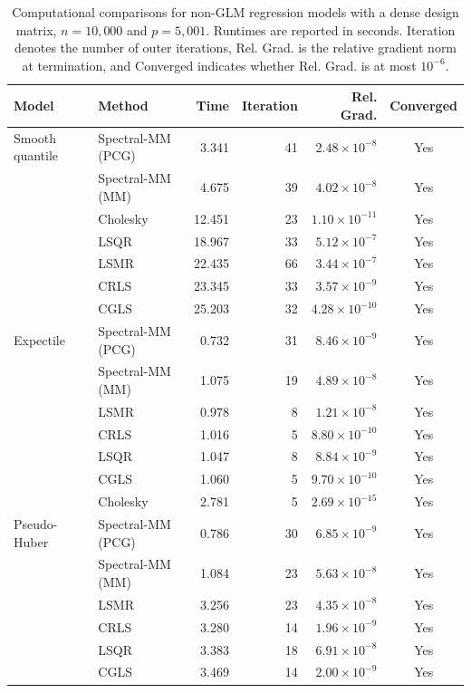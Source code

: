 \begin{table}[htbp]
\centering
\caption{
Computational comparisons for non-GLM regression models with a dense design matrix,
$n=10{,}000$ and $p=5{,}001$.
Runtimes are reported in seconds.
Iteration denotes the number of outer iterations,
Rel. Grad. is the relative gradient norm at termination,
and Converged indicates whether Rel. Grad. is at most $10^{-6}$.
}
\label{tab:nonglm-comparison-dense}
\begin{tabular}{llrrrc}
\toprule
Model & Method & Time & Iteration & Rel. Grad. & Converged \\
\midrule
Smooth quantile & Spectral-MM (PCG) & 3.341 & 41 & $2.48\times10^{-8}$ & Yes \\
 & Spectral-MM (MM) & 4.675 & 39 & $4.02\times10^{-8}$ & Yes \\
 & Cholesky & 12.451 & 23 & $1.10\times10^{-11}$ & Yes \\
 & LSQR & 18.967 & 33 & $5.12\times10^{-7}$ & Yes \\
 & LSMR & 22.435 & 66 & $3.44\times10^{-7}$ & Yes \\
 & CRLS & 23.345 & 33 & $3.57\times10^{-9}$ & Yes \\
 & CGLS & 25.203 & 32 & $4.28\times10^{-10}$ & Yes \\
\midrule
Expectile & Spectral-MM (PCG) & 0.732 & 31 & $8.46\times10^{-9}$ & Yes \\
 & Spectral-MM (MM) & 1.075 & 19 & $4.89\times10^{-8}$ & Yes \\
 & LSMR & 0.978 & 8 & $1.21\times10^{-8}$ & Yes \\
 & CRLS & 1.016 & 5 & $8.80\times10^{-10}$ & Yes \\
 & LSQR & 1.047 & 8 & $8.84\times10^{-9}$ & Yes \\
 & CGLS & 1.060 & 5 & $9.70\times10^{-10}$ & Yes \\
 & Cholesky & 2.781 & 5 & $2.69\times10^{-15}$ & Yes \\
\midrule
Pseudo-Huber & Spectral-MM (PCG) & 0.786 & 30 & $6.85\times10^{-9}$ & Yes \\
 & Spectral-MM (MM) & 1.084 & 23 & $5.63\times10^{-8}$ & Yes \\
 & LSMR & 3.256 & 23 & $4.35\times10^{-8}$ & Yes \\
 & CRLS & 3.280 & 14 & $1.96\times10^{-9}$ & Yes \\
 & LSQR & 3.383 & 18 & $6.91\times10^{-8}$ & Yes \\
 & CGLS & 3.469 & 14 & $2.00\times10^{-9}$ & Yes \\

\end{tabular}
\end{table}

